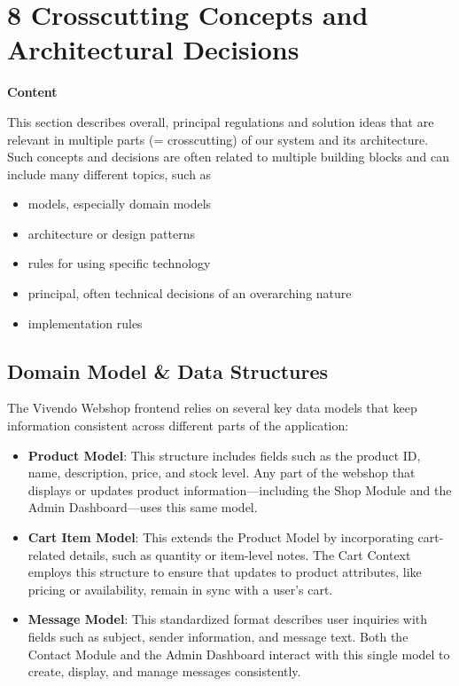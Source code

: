 \hypertarget{section-concepts}{%
\section{8 Crosscutting Concepts and Architectural Decisions}\label{section-concepts}}

\textbf{Content}

This section describes overall, principal regulations and solution ideas that are relevant in multiple parts (= crosscutting) of our system and its architecture. Such concepts and decisions are often related to multiple building blocks and can include many different topics, such as

\begin{itemize}
\item
  models, especially domain models
\item
  architecture or design patterns
\item
  rules for using specific technology
\item
  principal, often technical decisions of an overarching nature
\item
  implementation rules
\end{itemize}

\subsection{Domain Model \& Data Structures}
The Vivendo Webshop frontend relies on several key data models that keep information consistent across different parts of the application:

\begin{itemize}
  \item \textbf{Product Model}: This structure includes fields such as the product ID, name, description, price, and stock level. Any part of the webshop that displays or updates product information---including the Shop Module and the Admin Dashboard---uses this same model.
  
  \item \textbf{Cart Item Model}: This extends the Product Model by incorporating cart-related details, such as quantity or item-level notes. The Cart Context employs this structure to ensure that updates to product attributes, like pricing or availability, remain in sync with a user's cart.
  
  \item \textbf{Message Model}: This standardized format describes user inquiries with fields such as subject, sender information, and message text. Both the Contact Module and the Admin Dashboard interact with this single model to create, display, and manage messages consistently.
\end{itemize}

